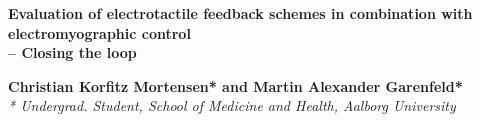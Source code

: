 
%

\begin{center}	
	{\huge\textbf{Evaluation of electrotactile feedback schemes in combination with electromyographic control \\– Closing the loop}}
	
	
	{\large \textbf{Christian Korfitz Mortensen* and Martin Alexander Garenfeld*}} \\
{\small \textit{* Undergrad. Student, School of Medicine and Health, Aalborg University}}
\end{center}

